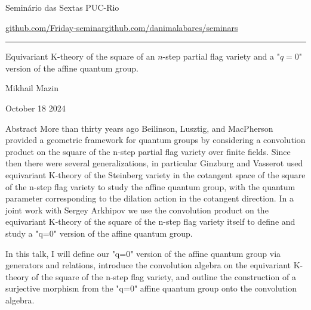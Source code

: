 


\begin{minipage}{\textwidth}
	\begin{minipage}{1\textwidth}
		Semin\'ario das Sextas \hfill PUC-Rio
		
		{\small\href{https://github.com/Friday-seminar/}{github.com/Friday-seminar}\hfill\href{https://github.com/danimalabares/seminars}{github.com/danimalabares/seminars}}
		\end{minipage}
\end{minipage}\vspace{.2cm}\hrule

\vspace{10pt}

{\Huge Equivariant K-theory of the square of an $n$-step partial flag variety and a "$q=0$" version of the affine quantum group.}

\hfill{\Large Mikhail Mazin}


\hfill{\large October 18 2024}

\begin{thing7}{Abstract}\leavevmode
	More than thirty years ago Beilinson, Lusztig, and MacPherson provided a geometric framework for quantum groups by considering a convolution product on the square of the n-step partial flag variety over finite fields. Since then there were several generalizations, in particular Ginzburg and Vasserot used equivariant K-theory of the Steinberg variety in the cotangent space of the square of the n-step flag variety to study the affine quantum group, with the quantum parameter corresponding to the dilation action in the cotangent direction. In a joint work with Sergey Arkhipov we use the convolution product on the equivariant K-theory of the square of the n-step flag variety itself to define and study a "q=0" version of the affine quantum group.

In this talk, I will define our "q=0" version of the affine quantum group via generators and relations, introduce the convolution algebra on the equivariant K-theory of the square of the n-step flag variety, and outline the construction of a surjective morphism from the "q=0" affine quantum group onto the convolution algebra.
\end{thing7}

